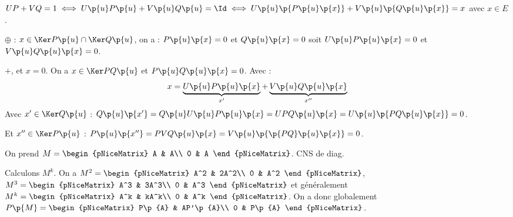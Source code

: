 \documentclass[a4paper,french,bookmarks]{book}
\begin{document}
    $UP + VQ = 1 \iff U\p{u}P\p{u} + V\p{u}Q\p{u} = \Id \iff U\p{u}\p{P\p{u}\p{x}} + V\p{u}\p{Q\p{u}\p{x}} = x$ avec $x \in E$.
    
    \begin{enumerate}
        \itt $\oplus$ : $x \in \Ker P\p{u} \cap \Ker Q\p{u}$, on a :
        $P\p{u}\p{x} = 0$ et $Q\p{u}\p{x} = 0$ soit $U\p{u}P\p{u}\p{x} = 0$ et $V\p{u}Q\p{u}\p{x} = 0$.
        
        \itt $+$, et $x = 0$.
        On a $x \in \Ker PQ\p{u}$ et $P\p{u}Q\p{u}\p{x} = 0$. Avec :
        \[ x = \underbrace{U\p{u}P\p{u}\p{x}}_{x'} + \underbrace{V\p{u}Q\p{u}\p{x}}_{x''}\]
        Avec $x' \in \Ker Q\p{u}$ : $Q\p{u}\p{x'} = Q\p{u}U\p{u}P\p{u}\p{x} = UPQ\p{u}\p{x} = U\p{u}\p{PQ\p{u}\p{x}} = 0$.
        
        Et $x'' \in \Ker P\p{u}$ : $P\p{u}\p{x''} = PVQ\p{u}\p{x} = V\p{u}\p{\p{PQ}\p{u}\p{x}} = 0$.
        
        
    \end{enumerate}
    
    On prend $M = \begin{pNiceMatrix}
        A & A\\
        0 & A
    \end{pNiceMatrix}$. CNS de diag.
    
    Calculons $M^k$. On a $M^2 = \begin{pNiceMatrix}
        A^2 & 2A^2\\
        0 & A^2
    \end{pNiceMatrix}$, $M^3 = \begin{pNiceMatrix}
        A^3 & 3A^3\\
        0 & A^3
    \end{pNiceMatrix}$ et généralement $M^k = \begin{pNiceMatrix}
        A^k & kA^k\\
        0 & A^k
    \end{pNiceMatrix}$. On a donc globalement $P\p{M} = \begin{pNiceMatrix}
        P\p{A} & AP'\p{A}\\
        0 & P\p{A}
    \end{pNiceMatrix}$.
    
    
    
    
    \newpage
    
\end{document}
